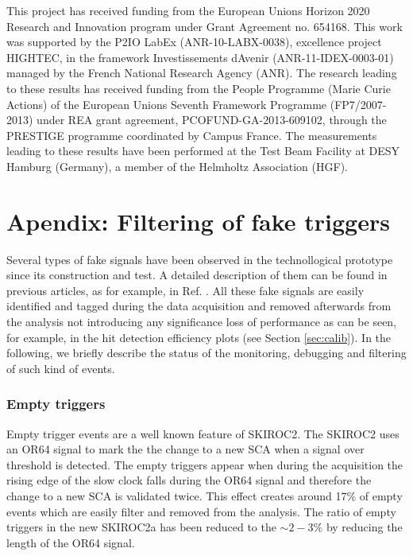 \documentclass[a4paper,11pt]{article}
\begin{document}
This project has received funding from the European Union{\textquotesingle}s Horizon 2020 Research and Innovation program under Grant Agreement no. 654168.
This work was supported by the P2IO LabEx (ANR-10-LABX-0038), excellence project HIGHTEC,
in the framework {\textquotesingle}Investissements d{\textquotesingle}Avenir{\textquotesingle}
(ANR-11-IDEX-0003-01) managed by the French National Research Agency (ANR).
The research leading to these results has received funding from the People Programme (Marie
Curie Actions) of the European Union{\textquotesingle}s Seventh Framework Programme (FP7/2007-2013)
under REA grant agreement, PCOFUND-GA-2013-609102, through the PRESTIGE
programme coordinated by Campus France.
The measurements leading to these results have been performed at the Test Beam Facility at DESY Hamburg (Germany), a member of the Helmholtz Association (HGF).

\appendix
\section{Apendix: Filtering of fake triggers}
\label{sec:retriggers}

Several types of fake signals have been observed in the technollogical prototype since its construction and test. A detailed description of them
can be found in previous articles, as for example, in Ref. \cite{Amjad:2014tha}. All these fake signals are easily identified
and tagged during the data acquisition and removed afterwards from the analysis
not introducing any significance loss of performance as can be seen, for example,
in the hit detection efficiency plots (see Section \ref{sec:calib}).
In the following, we briefly describe the status of the monitoring, debugging and filtering
of such kind of events.

\subsubsection*{Empty triggers}

Empty trigger events are a well known feature of SKIROC2. The SKIROC2 uses
an OR64 signal to mark the the change to a new SCA when a signal over threshold is
detected. The empty triggers appear when during
the acquisition the rising edge of the slow clock falls during the OR64 signal
and therefore the change to a new SCA is validated twice.
This effect creates around 17\% of empty events which are easily filter and removed from the
analysis. The ratio of empty triggers in the new SKIROC2a has been reduced to the $\sim2-3\%$
by reducing the length of the OR64 signal.
\end{document}
